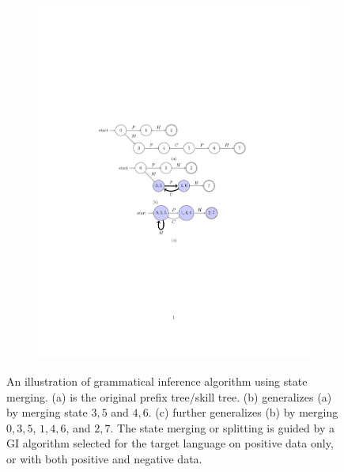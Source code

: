 \documentclass[letterpaper, 11 pt, onecolumn]{article}
\begin{document}
\begin{figure}[t!]
\begin{subfigure}[b]{0.28\textwidth}
\includegraphics[width=\textwidth]{fig/merge2.pdf}     
\caption{}\end{subfigure}
    \caption{An illustration of grammatical inference algorithm using state merging. (a) is the original prefix tree/skill tree. (b) generalizes (a) by merging state $3,5$ and $4,6$. (c) further generalizes (b) by merging $0,3,5$, $1,4,6$, and $2,7$. The state merging or splitting is guided by a GI algorithm selected for the target language on positive data only, or with both positive and negative data.}
    \label{fig:gi}
\end{figure}
\end{document}

